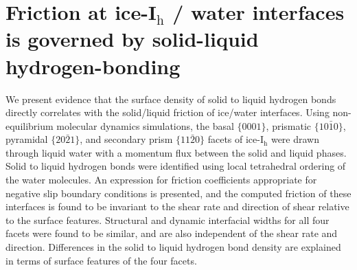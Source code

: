 

\chapter[Friction at ice-I$_\mathrm{h}$ / water interfaces]{Friction at ice-I$_\mathrm{h}$ / water interfaces is governed
  by solid-liquid hydrogen-bonding} 


% 


  We present evidence that the surface density of solid to liquid
  hydrogen bonds directly correlates with the solid/liquid friction of
  ice/water interfaces. Using non-equilibrium molecular dynamics
  simulations, the basal $\{0001\}$, prismatic $\{10\bar{1}0\}$,
  pyramidal $\{20\bar{2}1\}$, and secondary prism $\{11\bar{2}0\}$
  facets of ice-I$_\mathrm{h}$ were drawn through liquid water with a
  momentum flux between the solid and liquid phases. Solid to liquid
  hydrogen bonds were identified using local tetrahedral ordering of
  the water molecules. An expression for friction coefficients
  appropriate for negative slip boundary conditions is presented, and
  the computed friction of these interfaces is found to be invariant
  to the shear rate and direction of shear relative to the surface
  features. Structural and dynamic interfacial widths for all four
  facets were found to be similar, and are also independent of the
  shear rate and direction. Differences in the solid to liquid
  hydrogen bond density are explained in terms of surface features of
  the four facets.


